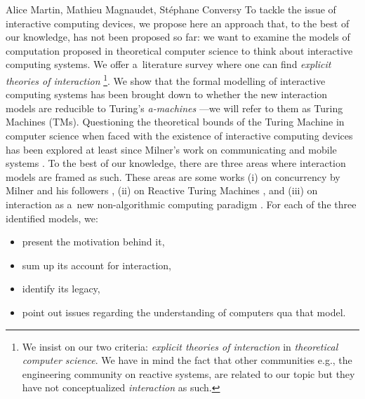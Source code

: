 \begin{artengenv2auth}{Alice Martin, Mathieu Magnaudet, Stéphane Conversy}
To tackle the issue of interactive computing devices, we propose here an approach that, to the best of our knowledge, has not been proposed so far: we want to examine the models of computation proposed in theoretical computer science to think about interactive computing systems. We offer a~literature survey where one can find \textit{explicit theories of interaction} \footnote{We insist on our two criteria: \textit{explicit theories of interaction} in \textit{theoretical computer science}. We have in mind the fact that other communities e.g., the engineering community on reactive systems, are related to our topic but they have not conceptualized \textit{interaction} as such.}. We show that the formal modelling of interactive computing systems has been brought down to whether the new interaction models are reducible to Turing’s \emph{a-machines} \parencite{Turing1937}---we will refer to them as Turing Machines (TMs). 
Questioning the theoretical bounds of the Turing Machine in computer science when faced with the existence of interactive computing devices has been explored at least since Milner's work on communicating and mobile systems \parencite{Milner1993, Milner1999}. To the best of our knowledge, there are three areas where interaction models are framed as such. These areas are some works (i) on concurrency by Milner and his followers \parencite{Milner1999, Milner2006}, (ii) on Reactive Turing Machines \parencite{Andersen1997, Baeten2013, VanLeeuwen2001, VanLeeuwen2006}, and (iii) on interaction as a~new non-algorithmic computing paradigm \parencite{Goldin2006, Wegner1997, Wegner2003}. For each of the three identified models, we:

\begin{itemize}
    \item present the motivation behind it, 
    \item sum up its account for interaction,
    \item identify its legacy,
    \item point out issues regarding the understanding of computers qua that model.
\end{itemize}


\end{artengenv2auth}
